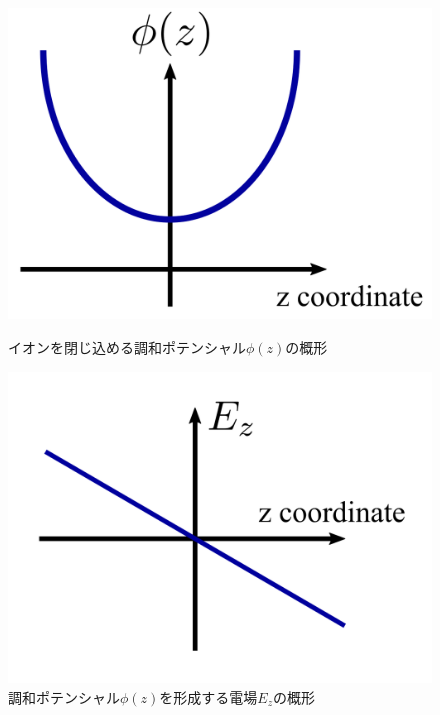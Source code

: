 \begin{figure}[h]
	\begin{minipage}{0.5\linewidth}
		\begin{center}
			\includegraphics[width = 0.8\columnwidth]{./results/figure/example_phi.png}
			\caption{イオンを閉じ込める調和ポテンシャル$\phi (z)$の概形}
			\label{fig:example_phi}
		\end{center}
	\end{minipage}
	\begin{minipage}{0.5\linewidth}
		\begin{center}
			\includegraphics[width = 0.8\columnwidth]{./results/figure/example_E.png}
			\caption{調和ポテンシャル$\phi (z)$を形成する電場$E_z$の概形}
			\label{fig:example_E}
		\end{center}
	\end{minipage}
\end{figure}

